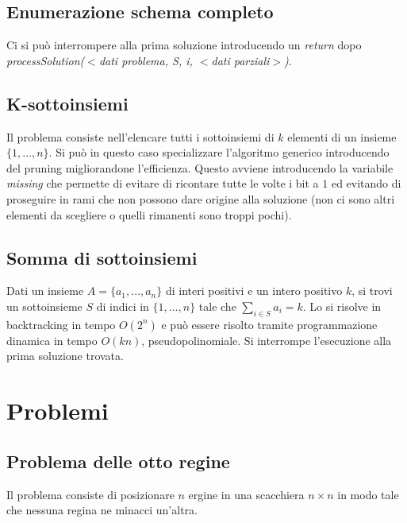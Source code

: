 \subsection{Enumerazione schema completo}

Ci si pu\`o interrompere alla prima soluzione introducendo un \emph{return} dopo \emph{processSolution($<$dati problema, S, i, $<$dati parziali$>$)}.
\subsection{K-sottoinsiemi}
Il problema consiste nell'elencare tutti i sottoinsiemi di $k$ elementi di un insieme $\{1, \dots, n\}$. Si pu\`o in questo caso specializzare l'algoritmo generico introducendo del
pruning migliorandone l'efficienza. Questo avviene introducendo la variabile \emph{missing} che permette di evitare di ricontare tutte le volte i bit a $1$ ed evitando di proseguire
in rami che non possono dare origine alla soluzione (non ci sono altri elementi da scegliere o quelli rimanenti sono troppi pochi).\\

\subsection{Somma di sottoinsiemi}
Dati un insieme $A = \{a_1, \dots, a_n\}$ di interi positivi e un intero positivo $k$, si trovi un sottoinsieme $S$ di indici in $\{1, \dots, n\}$ tale che 
$\sum\limits_{i\in S}a_i = k$. Lo si risolve in backtracking in tempo $O(2^n)$ e pu\`o essere risolto tramite programmazione dinamica in tempo $O(kn)$, pseudopolinomiale. Si interrompe
l'esecuzione alla prima soluzione trovata.\\

\section{Problemi}
\subsection{Problema delle otto regine}
Il problema consiste di posizionare $n$ ergine in una scacchiera $n\times n$ in modo tale che nessuna regina ne minacci un'altra.
